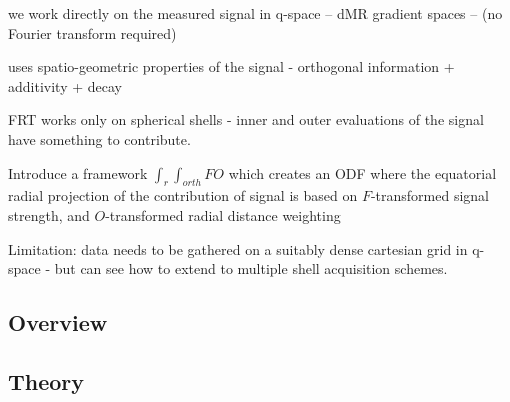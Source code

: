 \documentclass{bioinfo}
\begin{document}
we work directly on the measured signal in q-space -- dMR gradient
spaces -- (no Fourier transform required)

uses spatio-geometric properties of the signal - orthogonal information
+ additivity + decay

FRT works only on spherical shells - inner and outer evaluations of the
signal have something to contribute.

Introduce a framework $\int_r \int_{orth} F O$ which creates an ODF
where the equatorial radial projection of the contribution of signal is
based on $F$-transformed signal strength, and $O$-transformed radial
distance weighting

Limitation: data needs to be gathered on a suitably dense cartesian grid
in q-space - but can see how to extend to multiple shell acquisition
schemes.


\subsection{Overview}

\subsection{Theory}
\end{document}
